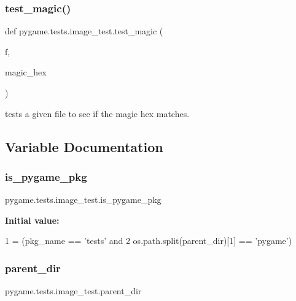 \subsubsection{\texorpdfstring{test\+\_\+magic()}{test\_magic()}}
{\footnotesize\ttfamily def pygame.\+tests.\+image\+\_\+test.\+test\+\_\+magic (\begin{DoxyParamCaption}\item[{}]{f,  }\item[{}]{magic\+\_\+hex }\end{DoxyParamCaption})}

\begin{DoxyVerb}tests a given file to see if the magic hex matches.
\end{DoxyVerb}
 

\subsection{Variable Documentation}
\mbox{\label{namespacepygame_1_1tests_1_1image__test_a200e61dc67c52d71c68b75ec44cfa808}} 
\subsubsection{\texorpdfstring{is\+\_\+pygame\+\_\+pkg}{is\_pygame\_pkg}}
{\footnotesize\ttfamily pygame.\+tests.\+image\+\_\+test.\+is\+\_\+pygame\+\_\+pkg}

{\bfseries Initial value\+:}
\begin{DoxyCode}
1 =  (pkg\_name == \textcolor{stringliteral}{'tests'} \textcolor{keywordflow}{and}
2                      os.path.split(parent\_dir)[1] == \textcolor{stringliteral}{'pygame'})
\end{DoxyCode}
\mbox{\label{namespacepygame_1_1tests_1_1image__test_a3d0c9598c3e3b778aa7b21bca6373724}} 
\subsubsection{\texorpdfstring{parent\+\_\+dir}{parent\_dir}}
{\footnotesize\ttfamily pygame.\+tests.\+image\+\_\+test.\+parent\+\_\+dir}

